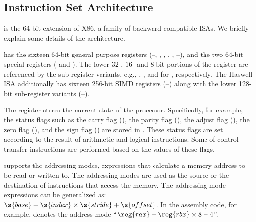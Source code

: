 \subsection{\ISA Instruction Set Architecture}

\ISA is the 64-bit extension of X86, a family of backward-compatible ISAs.
%
We briefly explain some details of the architecture.

\ISA has the sixteen 64-bit general purpose registers (--, , , , , --), and the two $64$-bit special registers ( and ).
The lower $32$-, $16$- and $8$-bit portions of the register are referenced by the sub-register variants, e.g., , , and  for , respectively.
The Haswell \ISA ISA additionally has sixteen 256-bit SIMD registers (--) along with the lower 128-bit sub-register variants (--).

The  register stores the current state of the processor.
Specifically, for example, the status flags such as the carry flag (), the parity flag (), the adjust flag (), the zero flag (), and the sign flag () are stored in .
These status flags are set according to the result of arithmetic and logical instructions.
Some of control transfer instructions are performed based on the values of these flags.

\ISA supports the addressing modes, expressions that calculate a memory address to be read or written to. The addressing modes are used as the source or the destination of instructions that access the memory.
The addressing mode expressions can be generalized as:
$\s{base} + \s{index} \times \s{stride} + \s{offset}$.
In the assembly code, for example,  denotes the address mode ``$\reg{rax} + \reg{rbx} \times 8 - 4$''.


